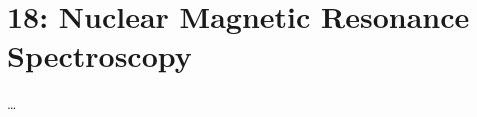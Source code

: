 \chapter{18: Nuclear Magnetic Resonance Spectroscopy}\label{18: Nuclear Magnetic Resonance Spectroscopy}
\begin{adjustwidth}{1cm}{1cm}
  \dots
\end{adjustwidth}


